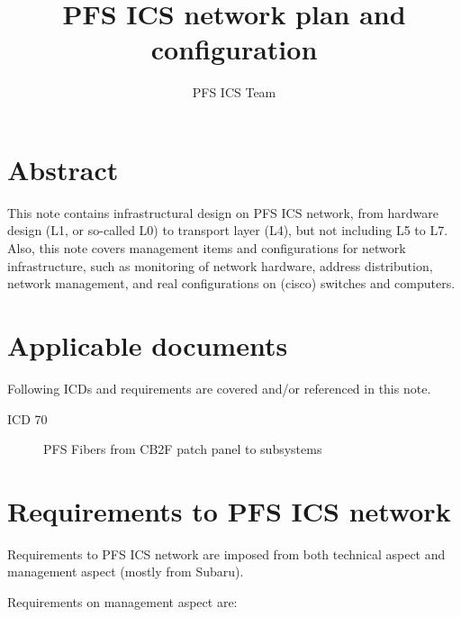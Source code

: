 \documentclass[a4paper,notitlepage]{article}
\title{PFS ICS network plan and configuration}
\author{PFS ICS Team}
\begin{document}
\drafttrue

\ssnhead

\section{Abstract}

This note contains infrastructural design on PFS ICS network, from hardware 
design (L1, or so-called L0) to transport layer (L4), but not including L5 
to L7. 
Also, this note covers management items and configurations for network 
infrastructure, such as monitoring of network hardware, address distribution, 
network management, and real configurations on (cisco) switches and computers. 

\section{Applicable documents}

Following ICDs and requirements are covered and/or referenced in this note. 

\begin{description}
  \item[ICD 70] PFS Fibers from CB2F patch panel to subsystems
\end{description}


\section{Requirements to PFS ICS network}

Requirements to PFS ICS network are imposed from both technical aspect and 
management aspect (mostly from Subaru). 

Requirements on management aspect are:
\end{document}
